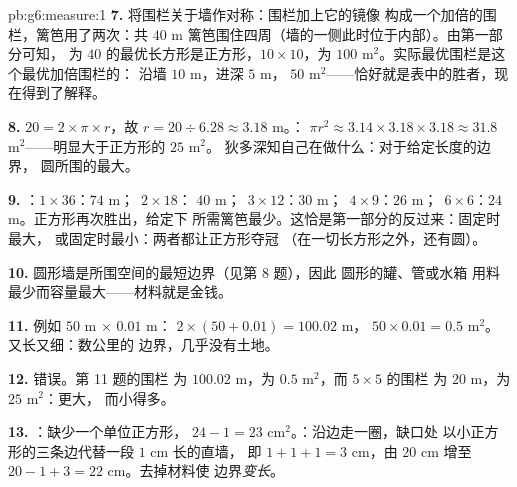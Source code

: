 \begin{solution}{pb:g6:measure:1}
\textbf{7.} 将围栏关于墙作对称：围栏加上它的镜像
构成一个加倍的围栏，篱笆用了两次：共 $40$ m
篱笆围住四周（墙的一侧此时位于内部）。由第一部分可知，
为 $40$ 的最优长方形是正方形，$10 \times
10$，为 $100$ m$^2$。实际最优围栏是这个最优加倍围栏的：
沿墙 $10$ m，进深 $5$ m，
$50$ m$^2$——恰好就是表中的胜者，现在得到了解释。

\textbf{8.}  $20 = 2 \times \pi \times r$，故
$r = 20 \div 6.28 \approx 3.18$ m。：
$\pi r^2 \approx 3.14 \times 3.18 \times 3.18 \approx
31.8$ m$^2$——明显大于正方形的 $25$ m$^2$。
狄多深知自己在做什么：对于给定长度的边界，
圆所围的最大。

\textbf{9.} ：$1 \times 36$：$74$ m；\ $2 \times 18$：
$40$ m；\ $3 \times 12$：$30$ m；\ $4 \times 9$：$26$ m；\
$6 \times 6$：$24$ m。正方形再次胜出，给定下
所需篱笆最少。这恰是第一部分的反过来：固定时最大，
或\omterm{def:g6:measure:area}{面积}固定时\omterm{def:g6:measure:perimeter}{周长}最小：两者都让正方形夺冠
（在一切长方形之外，还有圆）。

\textbf{10.} 圆形墙是所围空间的最短边界（见第 8 题），因此
圆形的罐、管或水箱
用料最少而容量最大——材料就是金钱。

\textbf{11.} 例如 $50$ m $\times$ $0.01$ m：
$2 \times (50 + 0.01) = 100.02$ m，\omterm{def:g6:measure:area}{面积}
$50 \times 0.01 = 0.5$ m$^2$。又长又细：数公里的
边界，几乎没有土地。

\textbf{12.} 错误。第 11 题的围栏
为 $100.02$ m，为 $0.5$ m$^2$，而 $5 \times 5$ 的围栏
为 $20$ m，为 $25$ m$^2$：\omterm{def:g6:measure:perimeter}{周长}更大，
而\omterm{def:g6:measure:area}{面积}小得多。

\textbf{13.} ：缺少一个单位正方形，
$24 - 1 = 23$ cm$^2$。：沿边走一圈，缺口处
以小正方形的三条边代替一段 $1$ cm 长的直墙，
即 $1 + 1 + 1 = 3$ cm，由 $20$ cm 增至
$20 - 1 + 3 = 22$ cm。去掉材料使
边界\emph{变长}。


\end{solution}
